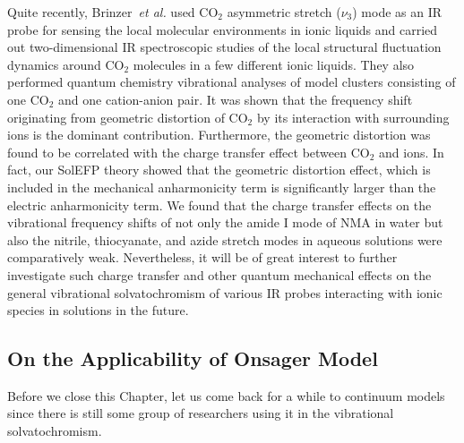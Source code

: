 \documentclass[a4paper,titlepage,twoside,fleqn,12pt]{book}
\begin{document}
\begin{refsection}
Quite recently, 
Brinzer~\emph{et al.}
used CO$_2$ asymmetric
stretch ($\nu_3$) mode as an IR probe for sensing the local molecular
environments in ionic liquids and carried out two\hyp{}dimensional
IR spectroscopic studies of the local structural fluctuation dynamics
around CO$_2$ molecules in a few different ionic 
liquids. \citep{Brinzer.Berquist.Zhe.Dutta.Johnson.Krisher.Lambrecht.Garrett-Roe.JCP.2015} 
They also performed quantum chemistry vibrational analyses
of model clusters consisting of one CO$_2$ and one cation-anion
pair. It was shown that the frequency shift originating from
geometric distortion of CO$_2$ by its interaction with surrounding
ions is the dominant contribution. Furthermore, the geometric
distortion was found to be correlated with the charge transfer
effect between CO$_2$ and ions. In fact, our SolEFP theory
showed that the geometric distortion effect, which is included
in the mechanical anharmonicity term
is significantly larger than the electric anharmonicity term.
We found that the charge transfer effects on the vibrational
frequency shifts of not only the amide I mode of NMA
in water \citep{Blasiak.Cho.JCP.2014} but also the nitrile, thiocyanate, and
azide stretch modes in aqueous solutions \citep{Lee.Choi.Cho.PCCP.2010} 
were comparatively
weak. Nevertheless, it will be of great interest to further
investigate such charge transfer and other quantum mechanical
effects on the general vibrational solvatochromism of various
IR probes interacting with ionic species in solutions in the
future.

\subsection{On the Applicability of Onsager Model}

Before we close this Chapter, let us come back for a while to
continuum models since there is still some group of researchers
using it in the vibrational solvatochromism. 


\end{refsection}
\end{document}
